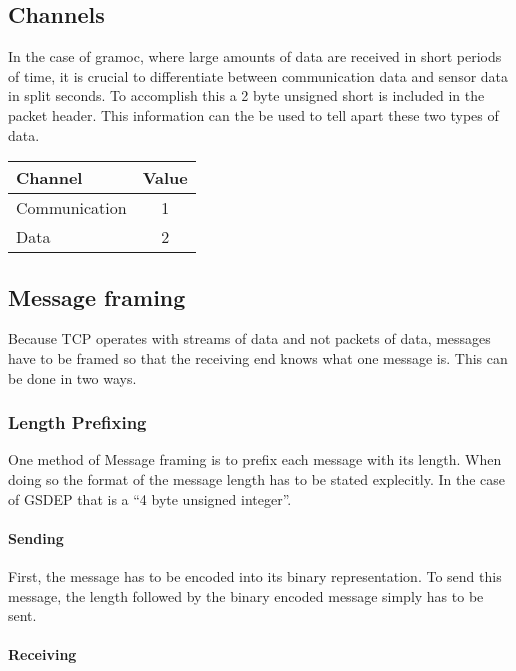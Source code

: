 \subsection{Channels}

In the case of gramoc, where large amounts of data are received in short periods of time, it is crucial to differentiate between communication data and sensor data in split seconds. To accomplish this a 2 byte unsigned short is included in the packet header. This information can the be used to tell apart these two types of data.

\begin{center}

	\begin{tabular}{| l | c |}
	\hline
	\textbf{Channel} & \textbf{Value} \\ \hline
	Communication & 1 \\ \hline
	Data & 2 \\
	\hline
	\end{tabular}

\end{center}

\subsection{Message framing}
Because TCP operates with streams of data and not packets of data, messages have to be framed so that the receiving end knows what one message is. This can be done in two ways. \cite{MessageFramingCleary,MessageFramingSkotzko}

\subsubsection{Length Prefixing}

One method of Message framing is to prefix each message with its length. When doing so the format of the message length has to be stated explecitly. In the case of GSDEP that is a ``4 byte unsigned integer''.

\paragraph{Sending}

First, the message has to be encoded into its binary representation. To send this message, the length followed by the binary encoded message simply has to be sent.

\paragraph{Receiving}

